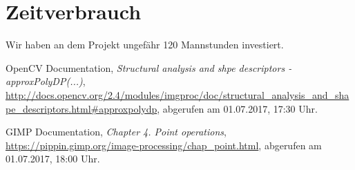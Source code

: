 \documentclass{../Vorlage/sebDenCls}
\begin{document}
\section{Zeitverbrauch}
Wir haben an dem Projekt ungefähr 120 Mannstunden investiert.

\begin{thebibliography}{9}
	
	OpenCV Documentation,
	\emph{Structural analysis and shpe descriptors - approxPolyDP(...)},
	\url{http://docs.opencv.org/2.4/modules/imgproc/doc/structural_analysis_and_shape_descriptors.html#approxpolydp},
	abgerufen am 01.07.2017, 17:30 Uhr.
	
	GIMP Documentation,
	\emph{Chapter 4. Point operations},
	\url{https://pippin.gimp.org/image-processing/chap_point.html},
	abgerufen am 01.07.2017, 18:00 Uhr.
\end{thebibliography}
\end{document}
